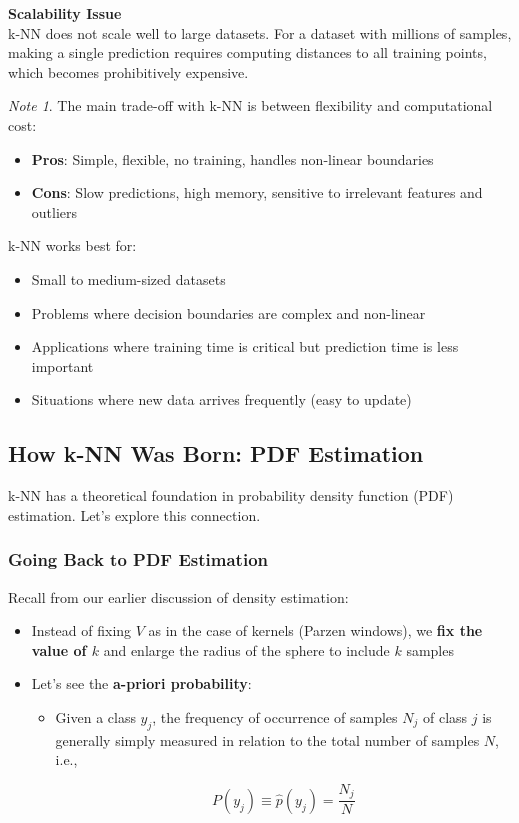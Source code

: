 \documentclass[11pt,a4paper]{article}
\theoremstyle{definition}
\theoremstyle{plain}
\theoremstyle{remark}
\newtheorem*{remark}{Note}
\begin{document}
\begin{center}
\colorbox{red!15}{\parbox{0.9\textwidth}{
\textbf{Scalability Issue}\\[0.2cm]
k-NN does not scale well to large datasets. For a dataset with millions of samples, making a single prediction requires computing distances to all training points, which becomes prohibitively expensive.
}}
\end{center}

\begin{remark}
The main trade-off with k-NN is between flexibility and computational cost:
\begin{itemize}
    \item \textbf{Pros}: Simple, flexible, no training, handles non-linear boundaries
    \item \textbf{Cons}: Slow predictions, high memory, sensitive to irrelevant features and outliers
\end{itemize}

k-NN works best for:
\begin{itemize}
    \item Small to medium-sized datasets
    \item Problems where decision boundaries are complex and non-linear
    \item Applications where training time is critical but prediction time is less important
    \item Situations where new data arrives frequently (easy to update)
\end{itemize}
\end{remark}

\subsection{How k-NN Was Born: PDF Estimation}

k-NN has a theoretical foundation in probability density function (PDF) estimation. Let's explore this connection.

\subsubsection{Going Back to PDF Estimation}

Recall from our earlier discussion of density estimation:

\begin{itemize}
    \item Instead of fixing $V$ as in the case of kernels (Parzen windows), we \textbf{fix the value of $k$} and enlarge the radius of the sphere to include $k$ samples
    
    \item Let's see the \textbf{a-priori probability}:
    \begin{itemize}
        \item Given a class $y_j$, the frequency of occurrence of samples $N_j$ of class $j$ is generally simply measured in relation to the total number of samples $N$, i.e.,
        
        \[
        P(y_j) \equiv \hat{p}(y_j) = \frac{N_j}{N}
        \]
    \end{itemize}
\end{itemize}
\end{document}
